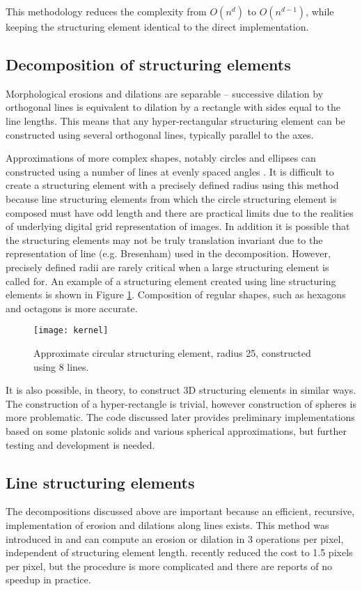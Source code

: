 \documentclass[a4paper]{InsightArticle}
\begin{document}
This methodology reduces the complexity from $O(n^d)$ to $O(n^{d-1})$,
while keeping the structuring element identical to the direct
implementation.

\subsection{Decomposition of structuring elements}
\label{sect:MMdecomp}
Morphological erosions and dilations are separable -- successive
dilation by orthogonal lines is equivalent to dilation by a rectangle
with sides equal to the line lengths. This means that any
hyper-rectangular structuring element can be constructed using several
orthogonal lines, typically parallel to the axes.

Approximations of more complex shapes, notably circles and
ellipses can constructed using a number of lines at evenly spaced
angles \cite{Adams93}. It is difficult to create a structuring element
with a precisely defined radius using this method because line
structuring elements from which the circle structuring element is
composed must have odd length and there are practical limits due to
the realities of underlying digital grid representation of images. In
addition it is possible that the structuring elements may not be truly
translation invariant due to the representation of line
(e.g. Bresenham) used in the decomposition. However, precisely defined
radii are rarely critical when a large structuring element is called
for. An example of a structuring element created using line
structuring elements is shown in Figure
\ref{fig:circledecomposition}. Composition of regular shapes, such as
hexagons and octagons is more accurate.

\begin{figure}[htbp]
\centering
\texttt{[image: kernel]}
\caption{Approximate circular structuring element, radius 25, constructed using 8 lines.\label{fig:circledecomposition}}
\end{figure}

It is also possible, in theory, to construct 3D structuring elements
in similar ways. The construction of a hyper-rectangle is trivial,
however construction of spheres is more problematic. The code
discussed later provides preliminary implementations based on some
platonic solids and various spherical approximations, but further
testing and development is needed.

\subsection{Line structuring elements}
The decompositions discussed above are important because an efficient,
recursive, implementation of erosion and dilations along lines
exists. This method was introduced in \cite{Gil1993,vanHerk1992a} and
can compute an erosion or dilation in 3 operations per pixel,
independent of structuring element length. \cite{Gil2000} recently
reduced the cost to 1.5 pixels per pixel, but the procedure is more
complicated and there are reports of no speedup in practice.
\end{document}
